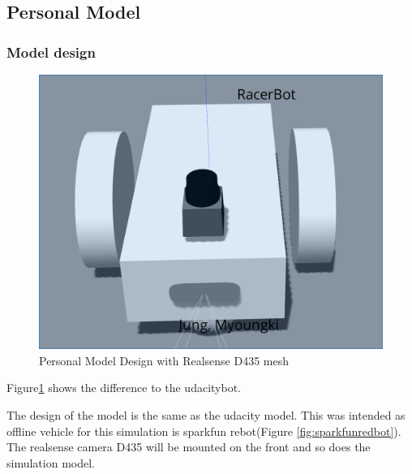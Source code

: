 \documentclass[10pt,journal,compsoc]{IEEEtran}
\begin{document}
\subsection{Personal Model}
\subsubsection{Model design}
\begin{figure}[thpb]
      \centering
      \includegraphics[width=\linewidth]{./img/racerbot.png}
      \caption{Personal Model Design with Realsense D435 mesh}
      \label{fig:Personal_Model}
\end{figure}
Figure\ref{fig:Personal_Model} shows the difference to the udacitybot.

The design of the model is the same as the udacity model. This was intended as offline vehicle for this simulation is sparkfun rebot(Figure \ref{fig:sparkfunredbot}).
The realsense camera D435 will be mounted on the front and so does the simulation model.
\end{document}
